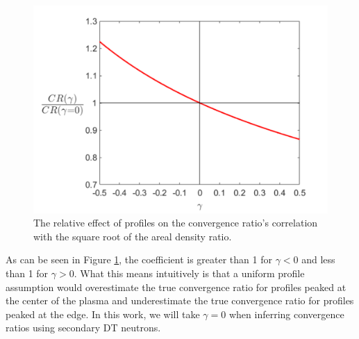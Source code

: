 \begin{figure}[h!]
    \centering
    \includegraphics[scale=0.8]{Figures/CR_Profile_Coef.pdf}
    \caption[Convergence Ratio Profile Effect Coefficient]{The relative effect of profiles on the convergence ratio's correlation with the square root of the areal density ratio.}
    \label{fig:CR_Profile_Coef}
\end{figure}

As can be seen in Figure \ref{fig:CR_Profile_Coef}, the coefficient is greater than 1 for $\gamma < 0$ and less than 1 for $\gamma > 0$. What this means intuitively is that a uniform profile assumption would overestimate the true convergence ratio for profiles peaked at the center of the plasma and underestimate the true convergence ratio for profiles peaked at the edge. In this work, we will take $\gamma=0$ when inferring convergence ratios using secondary DT neutrons. 







